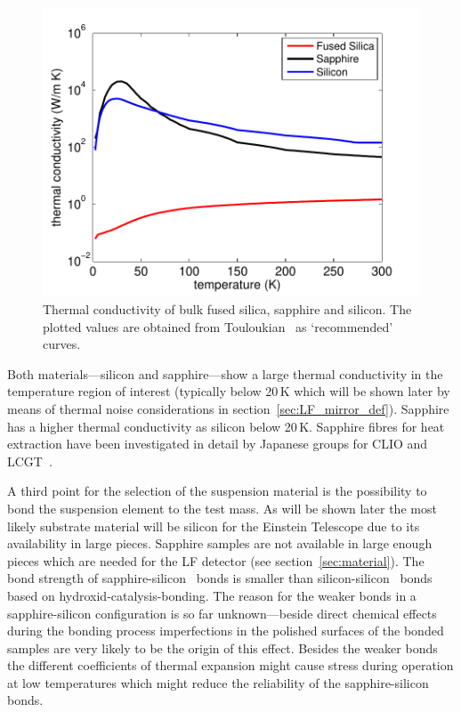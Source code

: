 \begin{figure}[!h]
\begin{center}
\includegraphics[scale=0.7]{./Sec_Suspensions/Figures/bulk_TC.pdf}
\end{center}
\caption{Thermal conductivity of bulk fused silica, sapphire and silicon. The plotted values are obtained from Touloukian~\cite{Touloukian1970_kappa_metal,Touloukian1970_kappa_nonmetal} as `recommended' curves.}
\label{fig:bulk_TC}
\end{figure}

Both materials---silicon and sapphire---show a large thermal conductivity in the temperature region of interest (typically below 20\,K which will be shown later by means of thermal noise considerations in section~\ref{sec:LF_mirror_def}). Sapphire has a higher thermal conductivity as silicon below 20\,K. Sapphire fibres for heat extraction have been investigated in detail by Japanese groups for CLIO and LCGT~\cite{Uchiyama2000,Tomaru2002b,Suzuki2003}.

A third point for the selection of the suspension material is the possibility to bond the suspension element to the test mass. As will be shown later the most likely substrate material will be silicon for the Einstein Telescope due to its availability in large pieces. Sapphire samples are not available in large enough pieces which are needed for the LF detector (see section~\ref{sec:material}). The bond strength of sapphire-silicon~\cite{Dari2010} bonds is smaller than silicon-silicon~\cite{Veggel2009,Dari2010} bonds based on hydroxid-catalysis-bonding. The reason for the weaker bonds in a sapphire-silicon configuration is so far unknown---beside direct chemical effects during the bonding process imperfections in the polished surfaces of the bonded samples are very likely to be the origin of this effect. Besides the weaker bonds the different coefficients of thermal expansion might cause stress during operation at low temperatures which might reduce the reliability of the sapphire-silicon bonds.

